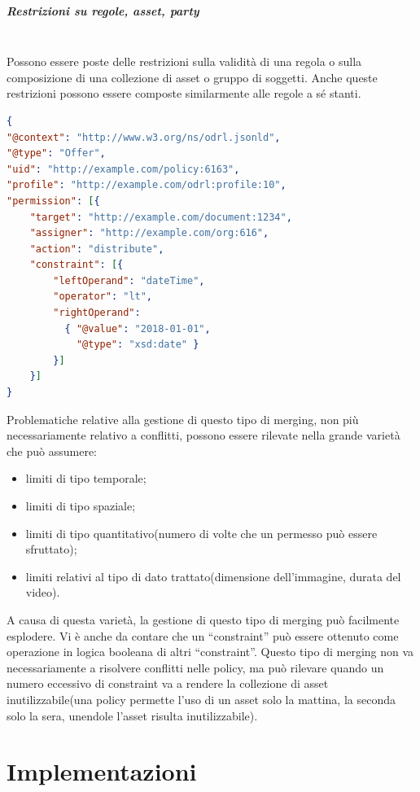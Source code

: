 \documentclass[12pt,a4paper,twoside]{book}
\begin{document}
\paragraph{Restrizioni su regole, asset, party}\mbox{}\\
Possono essere poste delle restrizioni sulla validità di una regola o sulla composizione di una collezione di asset o gruppo di soggetti. Anche queste restrizioni possono essere composte similarmente alle regole a sé stanti.\newpage
\begin{lstlisting}[language=json,firstnumber=1,caption={Esempio di limite temporale per una regola, può essere composto similarmente ai limiti sull'azione regolata},captionpos=b]
{
"@context": "http://www.w3.org/ns/odrl.jsonld",
"@type": "Offer",
"uid": "http://example.com/policy:6163",
"profile": "http://example.com/odrl:profile:10",
"permission": [{
	"target": "http://example.com/document:1234",
	"assigner": "http://example.com/org:616",
	"action": "distribute",
	"constraint": [{
		"leftOperand": "dateTime",
		"operator": "lt",
		"rightOperand": 
		  { "@value": "2018-01-01",
		    "@type": "xsd:date" }
		}]
	}]
}
\end{lstlisting}
Problematiche relative alla gestione di questo tipo di merging, non più necessariamente relativo a conflitti, possono essere rilevate nella grande varietà che può assumere:
\begin{itemize}
	\item limiti di tipo temporale;
	\item limiti di tipo spaziale;
	\item limiti di tipo quantitativo(numero di volte che un permesso può essere sfruttato);
	\item limiti relativi al tipo di dato trattato(dimensione dell'immagine, durata del video).
\end{itemize}
A causa di questa varietà, la gestione di questo tipo di merging può facilmente esplodere. Vi è anche da contare che un ``constraint'' può essere ottenuto come operazione in logica booleana di altri ``constraint''. Questo tipo di merging non va necessariamente a risolvere conflitti nelle policy, ma può rilevare quando un numero eccessivo di constraint va a rendere la collezione di asset inutilizzabile(una policy permette l'uso di un asset solo la mattina, la seconda solo la sera, unendole l'asset risulta inutilizzabile).

\chapter{Implementazioni}
\end{document}
